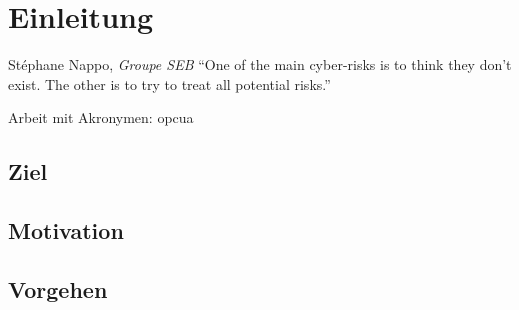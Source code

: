 \section{Einleitung}\label{sec:S1}

\begin{chapquote}{Stéphane Nappo, \textit{Groupe SEB}}
``One of the main cyber-risks is to think they don’t exist. The other is to try to treat all potential risks.''
\end{chapquote}

Arbeit mit Akronymen: \ac{opcua}\newline

\noindent \lipsum[1-4]


\subsection{Ziel}
\noindent \lipsum[1-2]


\subsection{Motivation}
\noindent \lipsum[1-2]


\subsection{Vorgehen}
\noindent \lipsum[1-2]

\newpage